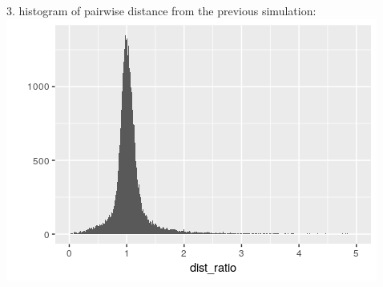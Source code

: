 \documentclass{article}
\begin{document}
3. histogram of pairwise distance from the previous simulation:\\
\includegraphics[scale=1]{hist_dist_ratio.png}
\end{document}
